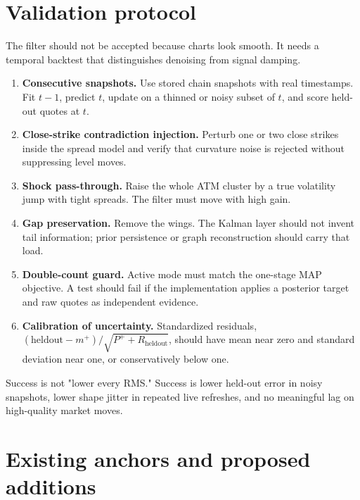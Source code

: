 \documentclass[11pt]{article}
\begin{document}
\section{Validation protocol}
\label{sec:validation}

The filter should not be accepted because charts look smooth. It needs a
temporal backtest that distinguishes denoising from signal damping.

\begin{enumerate}[leftmargin=1.6em]
\item \textbf{Consecutive snapshots.} Use stored chain snapshots with real
timestamps. Fit $t-1$, predict $t$, update on a thinned or noisy subset of
$t$, and score held-out quotes at $t$.
\item \textbf{Close-strike contradiction injection.} Perturb one or two close
strikes inside the spread model and verify that curvature noise is rejected
without suppressing level moves.
\item \textbf{Shock pass-through.} Raise the whole ATM cluster by a true
volatility jump with tight spreads. The filter must move with high gain.
\item \textbf{Gap preservation.} Remove the wings. The Kalman layer should not
invent tail information; prior persistence or graph reconstruction should carry
that load.
\item \textbf{Double-count guard.} Active mode must match the one-stage MAP
objective. A test should fail if the implementation applies a posterior target
and raw quotes as independent evidence.
\item \textbf{Calibration of uncertainty.} Standardized residuals,
$(\mathrm{heldout}-m^+)/\sqrt{P^++R_{\mathrm{heldout}}}$, should have mean near
zero and standard deviation near one, or conservatively below one.
\end{enumerate}

Success is not "lower every RMS." Success is lower held-out error in noisy
snapshots, lower shape jitter in repeated live refreshes, and no meaningful
lag on high-quality market moves.

\section{Existing anchors and proposed additions}
\label{sec:anchors}
\end{document}

